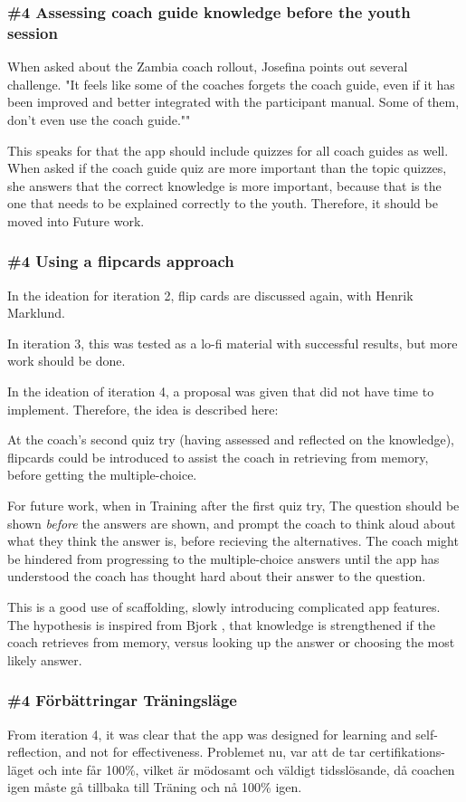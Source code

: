 
\subsubsection{\#4 Assessing coach guide knowledge before the youth session}
When asked about the Zambia coach rollout, Josefina points out several challenge. "It feels like some of the coaches forgets the coach guide, even if it has been improved and better integrated with the participant manual. Some of them, don't even use the coach guide.""

This speaks for that the app should include quizzes for all coach guides as well. When asked if the coach guide quiz are more important than the topic quizzes, she answers that the correct knowledge is more important, because that is the one that needs to be explained correctly to the youth. Therefore, it should be moved into Future work.

\subsubsection{\#4 Using a flipcards approach}
In the ideation for iteration 2, flip cards are discussed again, with Henrik Marklund.

In iteration 3, this was tested as a lo-fi material with successful results, but more work should be done.

In the ideation of iteration 4, a proposal was given that did not have time to implement. Therefore, the idea is described here:

At the coach's second quiz try (having assessed and reflected on the knowledge), flipcards could be introduced to assist the coach in retrieving from memory, before getting the multiple-choice.

For future work, when in Training after the first quiz try, The question should be shown \textit{before} the answers are shown, and prompt the coach to think aloud about what they think the answer is, before recieving the alternatives. The coach might be hindered from progressing to the multiple-choice answers until the app has understood the coach has thought hard about their answer to the question.

This is a good use of scaffolding, slowly introducing complicated app features. The hypothesis is inspired from Bjork \cite{bjork}, that knowledge is strengthened if the coach retrieves from memory, versus looking up the answer or choosing the most likely answer.

\subsubsection{\#4 Förbättringar Träningsläge}
From iteration 4, it was clear that the app was designed for learning and self-reflection, and not for effectiveness.
Problemet nu, var att de tar certifikations-läget och inte får 100\%, vilket är mödosamt och väldigt tidsslösande, då coachen igen måste gå tillbaka till Träning och nå 100\% igen.

